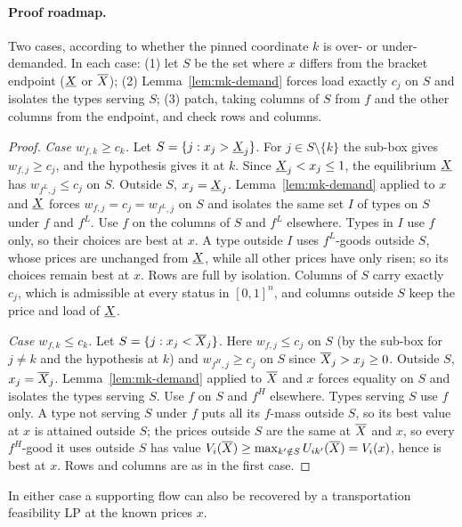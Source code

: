 \paragraph{Proof roadmap.} Two cases, according to whether the pinned coordinate $k$ is over- or
under-demanded. In each case: (1) let $S$ be the set where $x$ differs from the bracket endpoint
($\underline{X}$ or $\overline{X}$); (2) Lemma~\ref{lem:mk-demand} forces load exactly $c_j$ on $S$ and isolates the
types serving $S$; (3) patch, taking columns of $S$ from $f$ and the other columns from the endpoint, and
check rows and columns.

\begin{proof}
\emph{Case $w_{f,k}\ge c_k$.} Let $S=\{j:x_j>\underline{X}_j\}$. For $j\in S\setminus\{k\}$ the sub-box gives
$w_{f,j}\ge c_j$, and the hypothesis gives it at $k$. Since $\underline{X}_j<x_j\le1$, the equilibrium $\underline{X}{}$ has
$w_{f^L,j}\le c_j$ on $S$. Outside $S$, $x_j=\underline{X}_j$. Lemma~\ref{lem:mk-demand} applied to $x$ and $\underline{X}{}$
forces $w_{f,j}=c_j=w_{f^L,j}$ on $S$ and isolates the same set $I$ of types on $S$ under $f$ and $f^L$.
Use $f$ on the columns of $S$ and $f^L$ elsewhere. Types in $I$ use $f$ only, so their choices are best
at $x$. A type outside $I$ uses $f^L$-goods outside $S$, whose prices are unchanged from $\underline{X}{}$, while all
other prices have only risen; so its choices remain best at $x$. Rows are full by isolation. Columns of
$S$ carry exactly $c_j$, which is admissible at every status in $[0,1]^n$, and columns outside $S$ keep
the price and load of $\underline{X}{}$.

\emph{Case $w_{f,k}\le c_k$.} Let $S=\{j:x_j<\overline{X}_j\}$. Here $w_{f,j}\le c_j$ on $S$ (by the sub-box for
$j\ne k$ and the hypothesis at $k$) and $w_{f^H,j}\ge c_j$ on $S$ since $\overline{X}_j>x_j\ge0$. Outside $S$,
$x_j=\overline{X}_j$. Lemma~\ref{lem:mk-demand} applied to $\overline{X}{}$ and $x$ forces equality on $S$ and isolates the
types serving $S$. Use $f$ on $S$ and $f^H$ elsewhere. Types serving $S$ use $f$ only. A type not serving
$S$ under $f$ puts all its $f$-mass outside $S$, so its best value at $x$ is attained outside $S$; the
prices outside $S$ are the same at $\overline{X}{}$ and $x$, so every $f^H$-good it uses outside $S$ has value
$V_i(\overline{X}{})\ge\max_{k'\notin S}U_{ik'}(\overline{X}{})=V_i(x)$, hence is best at $x$. Rows and columns are as in the first
case.
\end{proof}

In either case a supporting flow can also be recovered by a transportation feasibility LP at the
known prices $x$.

